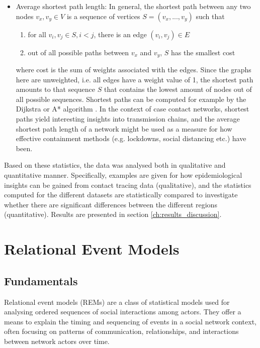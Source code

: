 \begin{itemize}
	\item Average shortest path length: In general, the shortest path between any two nodes $v_x,v_y \in V$ is a sequence of vertices $S = (v_x,...,v_y)$ such that 
	\begin{enumerate}
		\item for all $v_i,v_j \in S, i < j$, there is an edge $(v_i,v_j) \in E$
		\item out of all possible paths between $v_x$ and $v_y$, $S$ has the smallest cost
	\end{enumerate}
	where cost is the sum of weights associated with the edges. Since the graphs here are unweighted, i.e. all edges have a weight value of 1, the shortest path amounts to that sequence $S$ that contains the lowest amount of nodes out of all possible sequences. Shortest paths can be computed for example by the Dijkstra or A* algorithm . In the context of case contact networks, shortest paths yield interesting insights into transmission chains, and the average shortest path length of a network might be used as a measure for how effective containment methods (e.g. lockdowns, social distancing etc.) have been.
\end{itemize}  
\bigskip

\noindent Based on these statistics, the data was analysed both in qualitative and quantitative manner. Specifically, examples are given for how epidemiological insights can be gained from contact tracing data (qualitative), and the statistics computed for the different datasets are statistically compared to investigate whether there are significant differences between the different regions (quantitative). Results are presented in section \ref{ch:results_discussion}.

\section{Relational Event Models}
\label{sec:rem}

\subsection{Fundamentals}
\label{sec:rem_fundamentals}

Relational event models (REMs) are a class of statistical models used for analysing ordered sequences of social interactions among actors. They offer a means to explain the timing and sequencing of events in a social network context, often focusing on patterns of communication, relationships, and interactions between network actors over time. 

